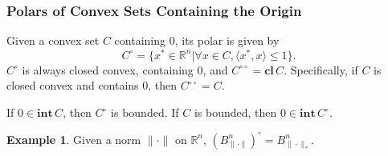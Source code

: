 \documentclass[openany]{book}
\theoremstyle{definition}
\newtheorem{example}{Example}[chapter]
\theoremstyle{remark}
\begin{document}
\subsubsection{Polars of Convex Sets Containing the Origin}
Given a convex set $C$ containing $0$, its polar is given by
\begin{equation*}
    C^{\circ}=\{x^*\in \mathbb{R}^n|\forall x\in C,\langle x^*,x\rangle\le1\}.
\end{equation*}
$C^{\circ}$ is always closed convex, containing $0$, and $C^{\circ\circ}=\mathbf{cl}\,C$. Specifically, if $C$ is closed convex and contains $0$, then $C^{\circ\circ}=C$.

If $0\in \mathbf{int}\,C$, then $C^{\circ}$ is bounded. If $C$ is bounded, then $0\in \mathbf{int}\,C^{\circ}$.
\begin{example}
    Given a norm $\|\cdot\|$ on $\mathbb{R}^n$, $(B_{\|\cdot\|}^n)^{\circ}=B_{\|\cdot\|_*}^n$.
\end{example}
\end{document}

